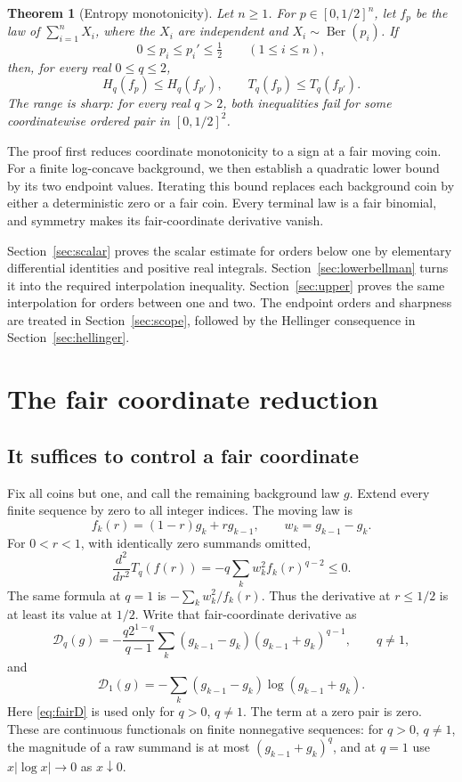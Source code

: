 \documentclass[11pt,a4paper]{amsart}
\numberwithin{equation}{section}
\newtheorem{theorem}{Theorem}[section]
\theoremstyle{remark}
\newcommand{\Ber}{\operatorname{Ber}}
\newcommand{\D}{\mathscr D}
\begin{document}
\begin{theorem}[Entropy monotonicity]\label{thm:main}
Let $n\ge1$. For $p\in[0,1/2]^n$, let $f_p$ be the law of
$\sum_{i=1}^n X_i$, where the $X_i$ are independent and
$X_i\sim\Ber(p_i)$. If
\[
 0\le p_i\le p_i'\le\tfrac12\qquad(1\le i\le n),
\]
then, for every real $0\le q\le2$,
\[
 H_q(f_p)\le H_q(f_{p'}),\qquad
 T_q(f_p)\le T_q(f_{p'}).
\]
The range is sharp: for every real $q>2$, both inequalities fail for
some coordinatewise ordered pair in $[0,1/2]^2$.
\end{theorem}

The proof first reduces coordinate monotonicity to a sign at a fair
moving coin. For a finite log-concave background, we then establish a
quadratic lower bound by its two endpoint values. Iterating this
bound replaces each background coin by either a deterministic zero
or a fair coin. Every terminal law is a fair binomial, and symmetry
makes its fair-coordinate derivative vanish.

Section~\ref{sec:scalar} proves the scalar estimate for orders below
one by elementary differential identities and positive real
integrals. Section~\ref{sec:lowerbellman} turns it into the required
interpolation inequality. Section~\ref{sec:upper} proves the same
interpolation for orders between one and two. The endpoint orders
and sharpness are treated in Section~\ref{sec:scope}, followed by the
Hellinger consequence in Section~\ref{sec:hellinger}.

\section{The fair coordinate reduction}
\label{sec:reduction}

\subsection{It suffices to control a fair coordinate}

Fix all coins but one, and call the remaining background law $g$.
Extend every finite sequence by zero to all integer indices. The
moving law is
\[
f_k(r)=(1-r)g_k+rg_{k-1},\qquad w_k=g_{k-1}-g_k.
\]
For $0<r<1$, with identically zero summands omitted,
\begin{equation}
\frac{d^2}{dr^2}T_q(f(r))
=-q\sum_k w_k^2f_k(r)^{q-2}\le0.
\label{eq:coordinateconcavity}
\end{equation}
The same formula at $q=1$ is $-\sum_k w_k^2/f_k(r)$. Thus the derivative
at $r\le1/2$ is at least its value at $1/2$. Write that fair-coordinate
derivative as
\begin{equation}
\D_q(g)=-\frac{q2^{1-q}}{q-1}
\sum_k(g_{k-1}-g_k)(g_{k-1}+g_k)^{q-1},\qquad q\ne1,
\label{eq:fairD}
\end{equation}
and
\begin{equation}
\D_1(g)=-\sum_k(g_{k-1}-g_k)\log(g_{k-1}+g_k).
\label{eq:fairD1}
\end{equation}
Here \eqref{eq:fairD} is used only for $q>0$, $q\ne1$.
The term at a zero pair is zero. These are continuous functionals on
finite nonnegative sequences: for $q>0$, $q\ne1$, the magnitude of a raw
summand is at most $(g_{k-1}+g_k)^q$, and at $q=1$ use
$x|\log x|\to0$ as $x\downarrow0$.
\end{document}

